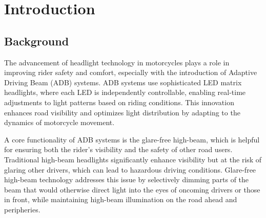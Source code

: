 \chapter{Introduction}

\section{Background} %
The advancement of headlight technology in motorcycles plays a role in improving rider safety and comfort, especially with the introduction of Adaptive Driving Beam (ADB) systems. ADB systems use sophisticated LED matrix headlights, where each LED is independently controllable, enabling real-time adjustments to light patterns based on riding conditions. This innovation enhances road visibility and optimizes light distribution by adapting to the dynamics of motorcycle movement. \cite{Intro_ADB_Def} \cite{ADB_Glare_Assesment_USA}

A core functionality of ADB systems is the glare-free high-beam, which is helpful for ensuring both the rider's visibility and the safety of other road users. Traditional high-beam headlights significantly enhance visibility but at the risk of glaring other drivers, which can lead to hazardous driving conditions. Glare-free high-beam technology addresses this issue by selectively dimming parts of the beam that would otherwise direct light into the eyes of oncoming drivers or those in front, while maintaining high-beam illumination on the road ahead and peripheries. \cite{Intro_ADB_Def}

